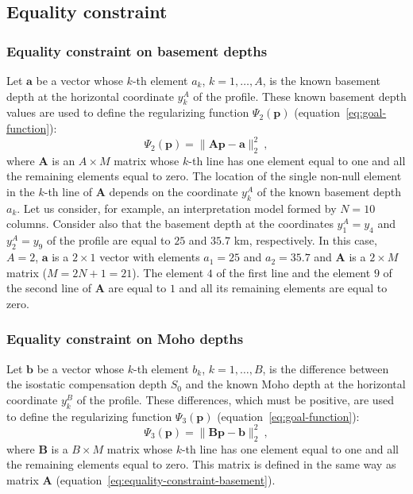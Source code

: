 \documentclass[manuscript]{geophysics}
\begin{document}
\subsection{Equality constraint}

\subsubsection*{Equality constraint on basement depths}

Let $\mathbf{a}$ be a vector whose $k$-th element $a_{k}$,
$k = 1, \dots, A$, is the known basement depth at the horizontal coordinate
$y^{A}_{k}$ of the profile. These known basement depth values are used to define 
the regularizing function $\Psi_{2}(\mathbf{p})$ 
(equation~\ref{eq:goal-function}):
\begin{equation}
\Psi_{2}(\mathbf{p}) = \| \mathbf{A}\mathbf{p} - \mathbf{a} \|_{2}^{2} \: ,
\label{eq:equality-constraint-basement}
\end{equation}
where $\mathbf{A}$ is an $A \times M$ matrix whose $k$-th line has one element 
equal to one and all the remaining elements equal to zero. The location of the
single non-null element in the $k$-th line of $\mathbf{A}$ depends on the coordinate
$y^{A}_{k}$ of the known basement depth $a_{k}$. Let us consider, 
for example, an interpretation model formed by $N = 10$ columns. Consider also that 
the basement depth at the coordinates $y^{A}_{1} = y_{4}$ and $y^{A}_{2} = y_{9}$ of
the profile are equal to $25$ and $35.7$ km, respectively. In this case, $A = 2$,
$\mathbf{a}$ is a $2 \times 1$ vector with elements $a_{1} = 25$ and $a_{2} = 35.7$
and $\mathbf{A}$ is a $2 \times M$ matrix ($M = 2N + 1 = 21$). The element $4$ of the
first line and the element $9$ of the second line of $\mathbf{A}$ are equal to $1$ and
all its remaining elements are equal to zero.

\subsubsection*{Equality constraint on Moho depths}

Let $\mathbf{b}$ be a vector whose $k$-th element $b_{k}$,
$k = 1, \dots, B$, is the difference between the isostatic compensation depth
$S_{0}$ and the known Moho depth at the horizontal coordinate $y^{B}_{k}$ of the
profile. These differences, which must be positive, are used to define the 
regularizing function $\Psi_{3}(\mathbf{p})$ (equation~\ref{eq:goal-function}):
\begin{equation}
\Psi_{3}(\mathbf{p}) = \| \mathbf{B}\mathbf{p} - \mathbf{b} \|_{2}^{2} \: ,
\label{eq:equality-constraint-moho}
\end{equation}
where $\mathbf{B}$ is a $B \times M$ matrix whose $k$-th line has one element 
equal to one and all the remaining elements equal to zero. This matrix is defined 
in the same way as matrix $\mathbf{A}$ (equation~\ref{eq:equality-constraint-basement}).
\end{document}
